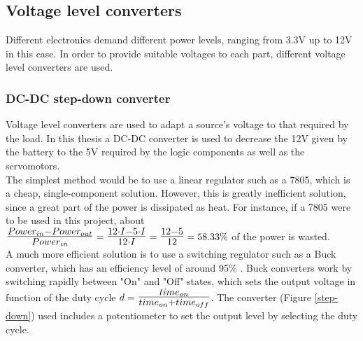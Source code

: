 	











\subsection{Voltage level converters}	

Different electronics demand different power levels, ranging from 3.3V up to 12V in this case. In order to provide suitable voltages to each part, different voltage level converters are used.

	\subsubsection{DC-DC step-down converter}

		Voltage level converters are used to adapt a source's voltage to that required by the load. In this thesis a DC-DC converter is used to decrease the 12V given by the battery to the 5V required by the logic components as well as the servomotors. \\
		
		The simplest method would be to use a linear regulator such as a 7805, which is a cheap, single-component solution. However, this is greatly inefficient solution, since a great part of the power is dissipated as heat.
		For instance, if a 7805 were to be used in this project, about $\mbox{\Large $\frac{Power_{in} - Power_{out} }{Power_{in} }$}=\mbox{\Large $\frac{12 \cdot I -5 \cdot I}{12\cdot I}$}=\mbox{\Large $\frac{12-5}{12}$}=58.33\%$ of the power is wasted.\\


		A much more efficient solution is to use a switching regulator such as a Buck converter, which has an efficiency level of around 95\%  \cite{buck}. 
		Buck converters work by switching rapidly between "On" and "Off" states, which sets the output voltage in function of the duty cycle $d=\mbox{\Large $\frac{time_{on}}{time_{on}+time_{off}}$}$. The converter (Figure \ref{step-down}) used includes a potentiometer to set the output level by selecting the duty cycle. 
 
		

